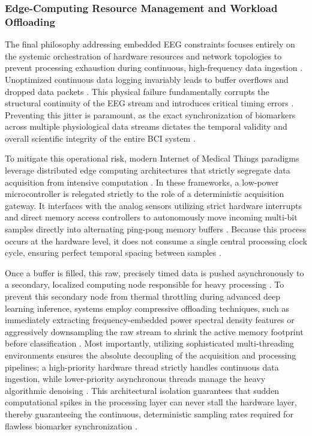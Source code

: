 \subsubsection{Edge-Computing Resource Management and Workload Offloading}

The final philosophy addressing embedded EEG constraints focuses entirely on the systemic orchestration of hardware resources and network topologies to prevent processing exhaustion during continuous, high-frequency data ingestion \cite{wang2026noninvasive}. Unoptimized continuous data logging invariably leads to buffer overflows and dropped data packets \cite{kanellopoulos2023networking}. This physical failure fundamentally corrupts the structural continuity of the EEG stream and introduces critical timing errors \cite{kargarnovin2023evidence}. Preventing this jitter is paramount, as the exact synchronization of biomarkers across multiple physiological data streams dictates the temporal validity and overall scientific integrity of the entire BCI system \cite{mullerputz2015towards}.

To mitigate this operational risk, modern Internet of Medical Things paradigms leverage distributed edge computing architectures that strictly segregate data acquisition from intensive computation \cite{brad2024iot}.  In these frameworks, a low-power microcontroller is relegated strictly to the role of a deterministic acquisition gateway. It interfaces with the analog sensors utilizing strict hardware interrupts and direct memory access controllers to autonomously move incoming multi-bit samples directly into alternating ping-pong memory buffers \cite{zayed2025efficient}. Because this process occurs at the hardware level, it does not consume a single central processing clock cycle, ensuring perfect temporal spacing between samples \cite{dobrescu2024direct}.

Once a buffer is filled, this raw, precisely timed data is pushed asynchronously to a secondary, localized computing node responsible for heavy processing \cite{an2025multi}. To prevent this secondary node from thermal throttling during advanced deep learning inference, systems employ compressive offloading techniques, such as immediately extracting frequency-embedded power spectral density features or aggressively downsampling the raw stream to shrink the active memory footprint before classification \cite{akor2025attention}. Most importantly, utilizing sophisticated multi-threading environments ensures the absolute decoupling of the acquisition and processing pipelines; a high-priority hardware thread strictly handles continuous data ingestion, while lower-priority asynchronous threads manage the heavy algorithmic denoising \cite{van2026open}. This architectural isolation guarantees that sudden computational spikes in the processing layer can never stall the hardware layer, thereby guaranteeing the continuous, deterministic sampling rates required for flawless biomarker synchronization \cite{savas2025future}.

